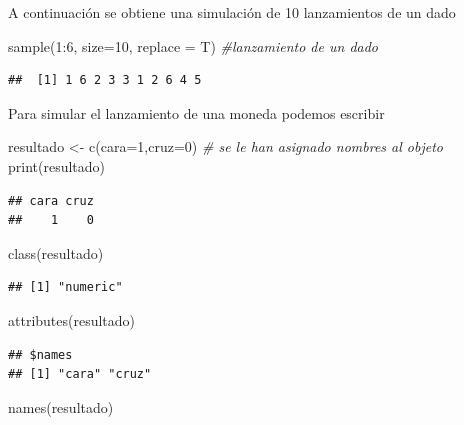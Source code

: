 \documentclass[
]{book}
\newenvironment{Shaded}{\begin{snugshade}}{\end{snugshade}}
\newcommand{\AttributeTok}[1]{\textcolor[rgb]{0.77,0.63,0.00}{#1}}
\newcommand{\CommentTok}[1]{\textcolor[rgb]{0.56,0.35,0.01}{\textit{#1}}}
\newcommand{\DecValTok}[1]{\textcolor[rgb]{0.00,0.00,0.81}{#1}}
\newcommand{\FunctionTok}[1]{\textcolor[rgb]{0.00,0.00,0.00}{#1}}
\newcommand{\NormalTok}[1]{#1}
\newcommand{\OtherTok}[1]{\textcolor[rgb]{0.56,0.35,0.01}{#1}}
\newcommand{\SpecialCharTok}[1]{\textcolor[rgb]{0.00,0.00,0.00}{#1}}
\theoremstyle{break}
\begin{document}
A continuación se obtiene una simulación de 10 lanzamientos de un dado

\begin{Shaded}
\begin{Highlighting}[]
\FunctionTok{sample}\NormalTok{(}\DecValTok{1}\SpecialCharTok{:}\DecValTok{6}\NormalTok{, }\AttributeTok{size=}\DecValTok{10}\NormalTok{, }\AttributeTok{replace =}\NormalTok{ T) }\CommentTok{\#lanzamiento de un dado}
\end{Highlighting}
\end{Shaded}

\begin{verbatim}
##  [1] 1 6 2 3 3 1 2 6 4 5
\end{verbatim}

Para simular el lanzamiento de una moneda podemos escribir

\begin{Shaded}
\begin{Highlighting}[]
\NormalTok{resultado }\OtherTok{\textless{}{-}} \FunctionTok{c}\NormalTok{(}\AttributeTok{cara=}\DecValTok{1}\NormalTok{,}\AttributeTok{cruz=}\DecValTok{0}\NormalTok{) }\CommentTok{\# se le han asignado nombres al objeto}
\FunctionTok{print}\NormalTok{(resultado)}
\end{Highlighting}
\end{Shaded}

\begin{verbatim}
## cara cruz 
##    1    0
\end{verbatim}

\begin{Shaded}
\begin{Highlighting}[]
\FunctionTok{class}\NormalTok{(resultado)}
\end{Highlighting}
\end{Shaded}

\begin{verbatim}
## [1] "numeric"
\end{verbatim}

\begin{Shaded}
\begin{Highlighting}[]
\FunctionTok{attributes}\NormalTok{(resultado)}
\end{Highlighting}
\end{Shaded}

\begin{verbatim}
## $names
## [1] "cara" "cruz"
\end{verbatim}

\begin{Shaded}
\begin{Highlighting}[]
\FunctionTok{names}\NormalTok{(resultado)}
\end{Highlighting}
\end{Shaded}
\end{document}
